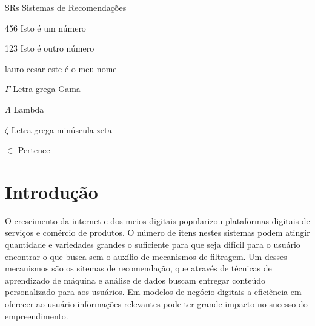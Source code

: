 \documentclass[
	12pt,				%
    oneside,			%
	a4paper,			%
	english,			%
	french,				%
	spanish,			%
	brazil,				%
	]{abntex2}
\begin{document}

\listoffigures* %
\cleardoublepage %


\listoftables*
\cleardoublepage

\begin{siglas}
  \item[SRs] Sistemas de Recomendações
  \item[456] Isto é um número
  \item[123] Isto é outro número
  \item[lauro cesar] este é o meu nome
\end{siglas}

\begin{simbolos}
  \item[$ \Gamma $] Letra grega Gama
  \item[$ \Lambda $] Lambda
  \item[$ \zeta $] Letra grega minúscula zeta
  \item[$ \in $] Pertence
\end{simbolos}


\tableofcontents*


\textual


\chapter{Introdução} %

O crescimento da internet e dos meios digitais popularizou plataformas digitais de serviços e comércio de produtos.
O número de itens nestes sistemas podem atingir quantidade e variedades grandes o suficiente para que seja difícil para o usuário 
encontrar o que busca sem o auxílio de mecanismos de filtragem. Um desses mecanismos são os sitemas de recomendação, que através de técnicas
de aprendizado de máquina e análise de dados buscam entregar conteúdo personalizado para aos usuários. Em modelos de negócio digitais a eficiência em 
oferecer ao usuário informações relevantes pode ter grande impacto no sucesso do empreendimento.
\end{document}
